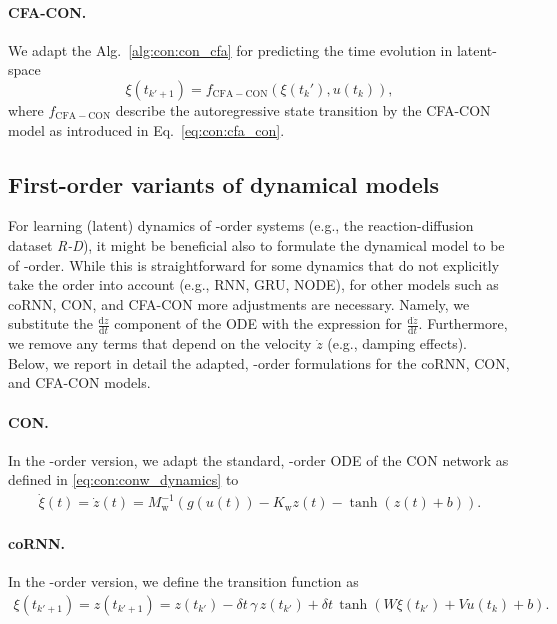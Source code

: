 \paragraph{CFA-CON.} We adapt the Alg.~\ref{alg:con:con_cfa} for predicting the time evolution in latent-space
\begin{equation}
    \xi(t_{k'+1}) = f_\mathrm{CFA-CON}(\xi(t_k'), u(t_k)),
\end{equation}
where $f_\mathrm{CFA-CON}$ describe the autoregressive state transition by the \gls{CFA-CON} model as introduced in Eq.~\ref{eq:con:cfa_con}.

\subsection{First-order variants of dynamical models}\label{sub:apx-con:1st_order_latent_dynamics}
For learning (latent) dynamics of -order systems (e.g., the reaction-diffusion dataset \emph{R-D}), it might be beneficial also to formulate the dynamical model to be of -order. 
While this is straightforward for some dynamics that do not explicitly take the order into account (e.g., RNN, GRU, NODE), for other models such as \gls{coRNN}, \gls{CON}, and \gls{CFA-CON} more adjustments are necessary.
Namely, we substitute the $\frac{\mathrm{d} z}{\mathrm{d}t}$ component of the \gls{ODE} with the expression for $\frac{\mathrm{d} \dot{z}}{\mathrm{d}t}$. Furthermore, we remove any terms that depend on the velocity $\dot{z}$ (e.g., damping effects).
Below, we report in detail the adapted, -order formulations for the \gls{coRNN}, \gls{CON}, and \gls{CFA-CON} models.

\paragraph{CON.} In the -order version, we adapt the standard, -order \gls{ODE} of the \gls{CON} network as defined in \eqref{eq:con:conw_dynamics} to
\begin{equation}
\begin{split}
    \dot{\xi}(t) = \dot{z}(t) = M_\mathrm{w}^{-1} \left ( g(u(t)) - K_\mathrm{w} z(t) - \tanh(z(t) + b) \right ).
\end{split}
\end{equation}

\paragraph{coRNN.} In the -order version, we define the transition function as
\begin{equation}
\begin{split}
    \xi(t_{k'+1}) = z(t_{k'+1}) = z(t_{k'}) - \delta t \, \gamma \, z(t_{k'}) + \delta t \, \tanh \left ( W \xi(t_{k'}) + V u(t_k) + b \right ).
\end{split}
\end{equation}

